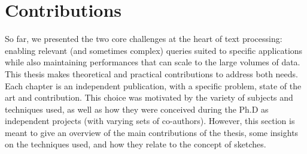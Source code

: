  \section{Contributions}\label{intro:sec:contrib}


So far, we presented the two core challenges at the heart of text processing: enabling relevant (and sometimes complex) queries suited to specific applications while also maintaining performances that can scale to the large volumes of data.
%
This thesis makes theoretical and practical contributions to address both needs. 
Each chapter is  an independent publication, with a specific problem, state of the art and contribution. This choice was motivated by the variety of subjects and techniques used, as well as how they were conceived during the Ph.D as independent projects (with varying sets of co-authors). However, this section is meant to give an overview of the main contributions of the thesis, some insights on the techniques used, and how they relate to the concept of sketches.

